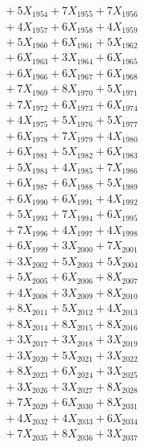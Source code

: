 \documentclass[a4paper,10pt]{article}
\begin{document}
{\begin{align}
&\;  + 5 X_{1954} + 7 X_{1955} + 7 X_{1956} \\[0.3ex]
&\;  + 4 X_{1957} + 6 X_{1958} + 4 X_{1959} \\[0.5ex]\allowbreak
&\;  + 5 X_{1960} + 6 X_{1961} + 5 X_{1962} \\[0.3ex]
&\;  + 6 X_{1963} + 3 X_{1964} + 6 X_{1965} \\[0.3ex]
&\;  + 6 X_{1966} + 6 X_{1967} + 6 X_{1968} \\[0.3ex]
&\;  + 7 X_{1969} + 8 X_{1970} + 5 X_{1971} \\[0.3ex]
&\;  + 7 X_{1972} + 6 X_{1973} + 6 X_{1974} \\[0.3ex]
&\;  + 4 X_{1975} + 5 X_{1976} + 5 X_{1977} \\[0.3ex]
&\;  + 6 X_{1978} + 7 X_{1979} + 4 X_{1980} \\[0.3ex]
&\;  + 6 X_{1981} + 5 X_{1982} + 6 X_{1983} \\[0.3ex]
&\;  + 5 X_{1984} + 4 X_{1985} + 7 X_{1986} \\[0.3ex]
&\;  + 6 X_{1987} + 6 X_{1988} + 5 X_{1989} \\[0.5ex]\allowbreak
&\;  + 6 X_{1990} + 6 X_{1991} + 4 X_{1992} \\[0.3ex]
&\;  + 5 X_{1993} + 7 X_{1994} + 6 X_{1995} \\[0.3ex]
&\;  + 7 X_{1996} + 4 X_{1997} + 4 X_{1998} \\[0.3ex]
&\;  + 6 X_{1999} + 3 X_{2000} + 7 X_{2001} \\[0.3ex]
&\;  + 3 X_{2002} + 5 X_{2003} + 5 X_{2004} \\[0.3ex]
&\;  + 5 X_{2005} + 6 X_{2006} + 8 X_{2007} \\[0.3ex]
&\;  + 4 X_{2008} + 3 X_{2009} + 8 X_{2010} \\[0.3ex]
&\;  + 8 X_{2011} + 5 X_{2012} + 4 X_{2013} \\[0.3ex]
&\;  + 8 X_{2014} + 8 X_{2015} + 8 X_{2016} \\[0.3ex]
&\;  + 3 X_{2017} + 3 X_{2018} + 3 X_{2019} \\[0.5ex]\allowbreak
&\;  + 3 X_{2020} + 5 X_{2021} + 3 X_{2022} \\[0.3ex]
&\;  + 8 X_{2023} + 6 X_{2024} + 3 X_{2025} \\[0.3ex]
&\;  + 3 X_{2026} + 3 X_{2027} + 8 X_{2028} \\[0.3ex]
&\;  + 7 X_{2029} + 6 X_{2030} + 8 X_{2031} \\[0.3ex]
&\;  + 4 X_{2032} + 4 X_{2033} + 6 X_{2034} \\[0.3ex]
&\;  + 7 X_{2035} + 8 X_{2036} + 3 X_{2037} \\[0.3ex]

\end{align}}
\end{document}
